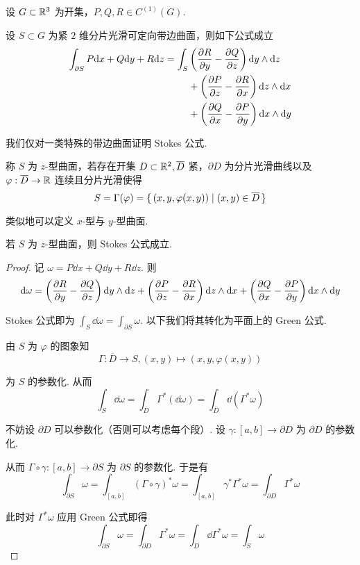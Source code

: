 
\begin{theorem}[Stokes 公式]
    设 $G\subset\mathbb{R}^3$ 为开集，$P,Q,R\in C^{(1)}(G)$.
    
    设 $S\subset G$ 为紧 $2$ 维分片光滑可定向带边曲面，则如下公式成立
$$
\begin{aligned}
    \int_{\partial S}P\mathrm{d} x+Q\mathrm{d} y+R\mathrm{d} z=\int_S&\left(\frac{\partial{R}}{\partial{y}}-\frac{\partial{Q}}{\partial{z}}\right)\mathrm{d} y\wedge\mathrm{d} z\\
    &+\left(\frac{\partial{P}}{\partial{z}}-\frac{\partial{R}}{\partial{x}}\right)\mathrm{d} z\wedge\mathrm{d} x\\
    &+\left(\frac{\partial{Q}}{\partial{x}}-\frac{\partial{P}}{\partial{y}}\right)\mathrm{d} x\wedge\mathrm{d} y
\end{aligned}
$$
\end{theorem}

我们仅对一类特殊的带边曲面证明 Stokes 公式.

\begin{definition}
    称 $S$ 为 $z$-型曲面，若存在开集 $D\subset\mathbb{R}^2,\overline{D}$ 紧，$\partial D$ 为分片光滑曲线以及 $\varphi:\overline{D}\to\mathbb{R}$ 连续且分片光滑使得
$$
S=\Gamma(\varphi)=\set{(x,y,\varphi(x,y))|(x,y)\in\overline{D}}
$$
\end{definition}


类似地可以定义 $x$-型与 $y$-型曲面.

\begin{lemma}
    若 $S$ 为 $z$-型曲面，则 Stokes 公式成立.
\end{lemma}
\begin{proof}
    记 $\omega=P\dd x+Q\dd y+R\dd z$. 则
$$
\mathrm{d}\omega=\left(\frac{\partial{R}}{\partial{y}}-\frac{\partial{Q}}{\partial{z}}\right)\mathrm{d} y\wedge\mathrm{d} z+\left(\frac{\partial{P}}{\partial{z}}-\frac{\partial{R}}{\partial{x}}\right)\mathrm{d} z\wedge\mathrm{d} x+\left(\frac{\partial{Q}}{\partial{x}}-\frac{\partial{P}}{\partial{y}}\right)\mathrm{d} x\wedge\mathrm{d} y
$$

    Stokes 公式即为 $\displaystyle\int_S\dd\omega=\int_{\partial S}\omega$. 以下我们将其转化为平面上的 Green 公式.
    
    由 $S$ 为 $\varphi$ 的图象知
$$
\Gamma:\overline{D}\to S,(x,y)\mapsto(x,y,\varphi(x,y))
$$

    为 $S$ 的参数化. 从而
$$
\int_S\dd\omega=\int_{\overline{D}}\Gamma^*(\dd\omega)=\int_{\overline{D}}\dd(\Gamma^*\omega)
$$

    不妨设 $\partial D$ 可以参数化（否则可以考虑每个段）. 设 $\gamma:[a,b]\to\partial D$ 为 $\partial D$ 的参数化.

    从而 $\Gamma\circ\gamma:[a,b]\to\partial S$ 为 $\partial S$ 的参数化. 于是有
$$
\int_{\partial S}\omega=\int_{[a,b]}(\Gamma\circ\gamma)^*\omega=\int_{[a,b]}\gamma^*\Gamma^*\omega=\int_{\partial D}\Gamma^*\omega
$$

    此时对 $\Gamma^*\omega$ 应用 Green 公式即得
$$
\int_{\partial S}\omega=\int_{\partial D}\Gamma^*\omega=\int_D\dd\Gamma^*\omega=\int_S\omega
$$
\end{proof}

